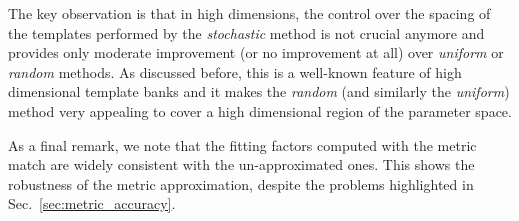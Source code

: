 \documentclass[twocolumn,showpacs,preprintnumbers,nofootinbib,prd,
superscriptaddress,10pt]{revtex4-2}
\begin{document}
The key observation is that in high dimensions, the control over the spacing of the templates performed by the {\it stochastic} method is not crucial anymore and provides only moderate improvement (or no improvement at all) over {\it uniform} or {\it random} methods. As discussed before, this is a well-known feature \cite{Messenger:2008ta, Allen:2021yuy, Allen:2022lqr} of high dimensional template banks and it makes the {\it random} (and similarly the {\it uniform}) method very appealing to cover a high dimensional region of the parameter space.

As a final remark, we note that the fitting factors computed with the metric match are widely consistent with the un-approximated ones. This shows the robustness of the metric approximation, despite the problems highlighted in Sec.~\ref{sec:metric_accuracy}.



\end{document}
